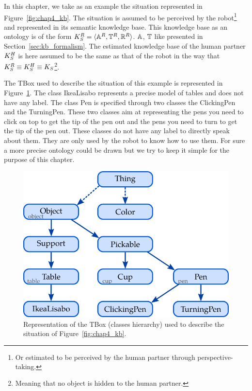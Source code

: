 In this chapter, we take as an example the situation represented in Figure~\ref{fig:chap4_kb}. The situation is assumed to be perceived by the robot\footnote{Or estimated to be perceived by the human partner through perspective-taking.} and represented in its semantic knowledge base. This knowledge base as an ontology is of the form $K_S^R = \langle \mathbb{A}^R, \mathbb{T}^R, \mathbb{R}^R \rangle$. $\mathbb{A}$, $\mathbb{T}$ like presented in Section~\ref{sec:kb_formalism}. The estimated knowledge base of the human partner $K_S^H$ is here assumed to be the same as that of the robot in the way that $K_S^R \equiv K_S^H \equiv K_S$\footnote{Meaning that no object is hidden to the human partner.}.

The TBox used to describe the situation of this example is represented in Figure~\ref{fig:chap4_kb_Tbox}. The class IkeaLisabo represents a precise model of tables and does not have any label. The class Pen is specified through two classes the ClickingPen and the TurningPen. These two classes aim at representing the pens you need to click on top to get the tip of the pen out and the pens you need to turn to get the tip of the pen out. These classes do not have any label to directly speak about them. They are only used by the robot to know how to use them. For sure a more precise ontology could be drawn but we try to keep it simple for the purpose of this chapter.

\begin{figure}[ht!]
\centering
\includegraphics[scale=0.4]{figures/chapter4/pens_Tbox.png}
\caption{\label{fig:chap4_kb_Tbox} Representation of the TBox (classes hierarchy) used to describe the situation of Figure~\ref{fig:chap4_kb}. }
\end{figure}

